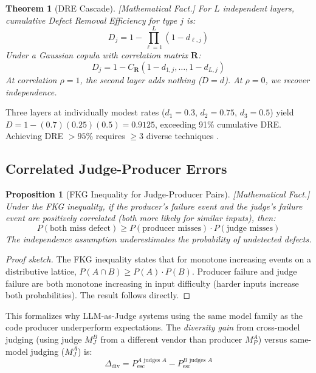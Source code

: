 \documentclass[11pt, a4paper, copyright]{googledeepmind}
\newtheorem{theorem}{Theorem}[section]
\newtheorem{proposition}{Proposition}[section]
\begin{document}
\begin{theorem}[DRE Cascade]
\label{thm:dre-cascade}
\emph{[Mathematical Fact.]} For $L$ independent layers, cumulative Defect Removal Efficiency for type $j$ is:
\begin{equation}
D_j = 1 - \prod_{\ell=1}^{L} (1 - d_{\ell,j})
\end{equation}
Under a Gaussian copula with correlation matrix $\mathbf{R}$:
\begin{equation}
D_j = 1 - C_{\mathbf{R}}(1 - d_{1,j}, \ldots, 1 - d_{L,j})
\end{equation}
At correlation $\rho = 1$, the second layer adds nothing ($D = d$). At $\rho = 0$, we recover independence.
\end{theorem}

Three layers at individually modest rates ($d_1 = 0.3$, $d_2 = 0.75$, $d_3 = 0.5$) yield $D = 1 - (0.7)(0.25)(0.5) = 0.9125$, exceeding 91\% cumulative DRE. Achieving DRE $> 95\%$ requires $\geq 3$ diverse techniques \citep{capersjones2012}.

\subsection{Correlated Judge-Producer Errors}

\begin{proposition}[FKG Inequality for Judge-Producer Pairs]
\label{prop:fkg}
\emph{[Mathematical Fact.]} Under the FKG inequality, if the producer's failure event and the judge's failure event are positively correlated (both more likely for similar inputs), then:
\begin{equation}
    P(\text{both miss defect}) \geq P(\text{producer misses}) \cdot P(\text{judge misses})
\end{equation}
The independence assumption \emph{underestimates} the probability of undetected defects.
\end{proposition}

\begin{proof}[Proof sketch]
The FKG inequality states that for monotone increasing events on a distributive lattice, $P(A \cap B) \geq P(A) \cdot P(B)$. Producer failure and judge failure are both monotone increasing in input difficulty (harder inputs increase both probabilities). The result follows directly.
\end{proof}

This formalizes why LLM-as-Judge systems using the same model family as the code producer underperform expectations. The \emph{diversity gain} from cross-model judging (using judge $M_J^B$ from a different vendor than producer $M_P^A$) versus same-model judging ($M_J^A$) is:
\begin{equation}
\Delta_{\mathrm{div}} = P_{\mathrm{esc}}^{A \text{ judges } A} - P_{\mathrm{esc}}^{B \text{ judges } A}
\end{equation}
\end{document}
